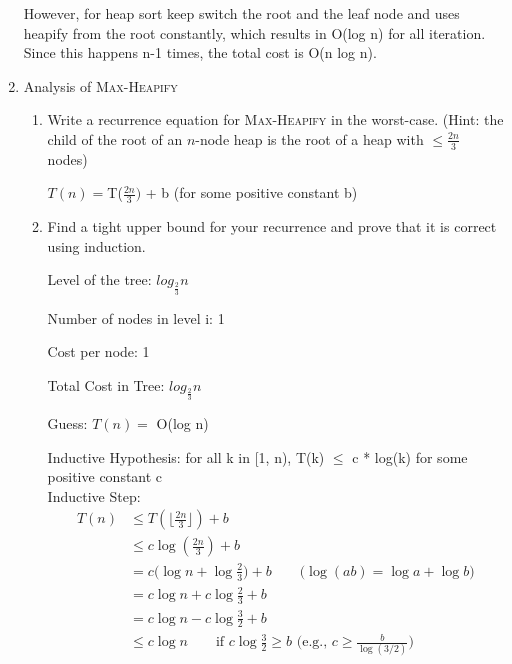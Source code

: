 \documentclass[11pt]{article}
\begin{document}
\begin{enumerate}
    However, for heap sort keep switch the root and the leaf node and uses heapify from the root constantly, which results in O(log n) for all iteration. Since this happens n-1 times, the total cost is O(n log n). 


    \item Analysis of \textsc{Max-Heapify}
    \begin{enumerate}
        \item Write a recurrence equation for \textsc{Max-Heapify} in the worst-case. (Hint: the child of the root of an $n$-node heap is the root of a heap with $\leq \frac{2n}{3}$ nodes)
        
        \begin{center}
            $T(n) = $T($\frac{2n}{3})$ + b (for some positive constant b)\\
        \end{center}

   
        \item Find a tight upper bound for your recurrence and prove that it is correct using induction. 
            \begin{center}
                Level of the tree: $log_\frac{2}{3}n$

                Number of nodes in level i: 1

                Cost per node: 1

                Total Cost in Tree: $log_\frac{2}{3}n$

                Guess: $T(n) = $ O(log n)\\
            \end{center}
            
            Inductive Hypothesis: for all k in [1, n), T(k) $\leq$ c * log(k) for some positive constant c \\
            Inductive Step:\\
            \begin{align*}
                T(n) &\le T\!\left(\Big\lfloor \tfrac{2n}{3} \Big\rfloor\right) + b \\
                &\le c \log\!\left(\tfrac{2n}{3}\right) + b \qquad\\
                &= c\big(\log n + \log \tfrac{2}{3}\big) + b \qquad \text{(} \log(ab)=\log a+\log b \text{)}\\
                &= c\log n + c\log \tfrac{2}{3} + b\\
                &= c\log n - c\log \tfrac{3}{2} + b \\
                &\le c\log n \qquad \text{if } c\log \tfrac{3}{2} \ge b \text{ (e.g., } c \ge \frac{b}{\log(3/2)} \text{)}
            \end{align*}
            

\end{enumerate}
\end{enumerate}
\end{document}
